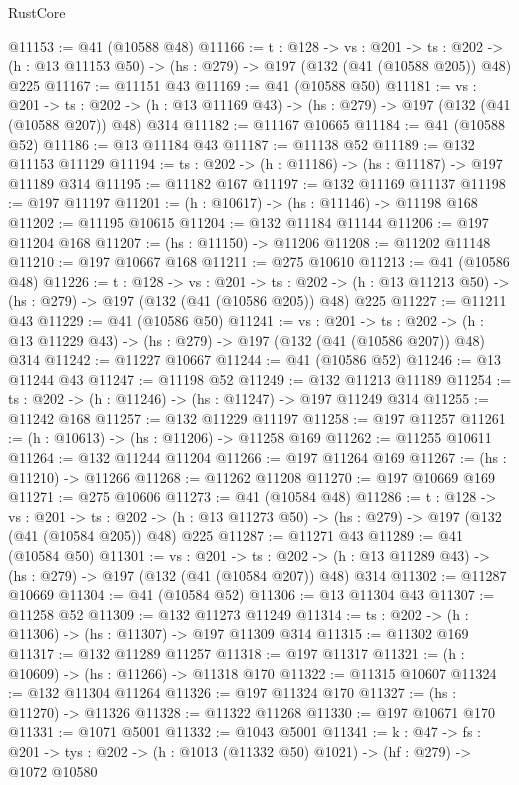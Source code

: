 \begin{lexlean}{RustCore}
\begin{coremodule}
@11153 := @41 (@10588 @48)
@11166 := {t : @128} ->
  {vs : @201} ->
  {ts : @202} -> (h : @13 @11153 @50) -> (hs : @279) -> @197 (@132 (@41 (@10588 @205)) @48) @225
@11167 := @11151 @43
@11169 := @41 (@10588 @50)
@11181 := {vs : @201} ->
  {ts : @202} -> (h : @13 @11169 @43) -> (hs : @279) -> @197 (@132 (@41 (@10588 @207)) @48) @314
@11182 := @11167 @10665
@11184 := @41 (@10588 @52)
@11186 := @13 @11184 @43
@11187 := @11138 @52
@11189 := @132 @11153 @11129
@11194 := {ts : @202} -> (h : @11186) -> (hs : @11187) -> @197 @11189 @314
@11195 := @11182 @167
@11197 := @132 @11169 @11137
@11198 := @197 @11197
@11201 := (h : @10617) -> (hs : @11146) -> @11198 @168
@11202 := @11195 @10615
@11204 := @132 @11184 @11144
@11206 := @197 @11204 @168
@11207 := (hs : @11150) -> @11206
@11208 := @11202 @11148
@11210 := @197 @10667 @168
@11211 := @275 @10610
@11213 := @41 (@10586 @48)
@11226 := {t : @128} ->
  {vs : @201} ->
  {ts : @202} -> (h : @13 @11213 @50) -> (hs : @279) -> @197 (@132 (@41 (@10586 @205)) @48) @225
@11227 := @11211 @43
@11229 := @41 (@10586 @50)
@11241 := {vs : @201} ->
  {ts : @202} -> (h : @13 @11229 @43) -> (hs : @279) -> @197 (@132 (@41 (@10586 @207)) @48) @314
@11242 := @11227 @10667
@11244 := @41 (@10586 @52)
@11246 := @13 @11244 @43
@11247 := @11198 @52
@11249 := @132 @11213 @11189
@11254 := {ts : @202} -> (h : @11246) -> (hs : @11247) -> @197 @11249 @314
@11255 := @11242 @168
@11257 := @132 @11229 @11197
@11258 := @197 @11257
@11261 := (h : @10613) -> (hs : @11206) -> @11258 @169
@11262 := @11255 @10611
@11264 := @132 @11244 @11204
@11266 := @197 @11264 @169
@11267 := (hs : @11210) -> @11266
@11268 := @11262 @11208
@11270 := @197 @10669 @169
@11271 := @275 @10606
@11273 := @41 (@10584 @48)
@11286 := {t : @128} ->
  {vs : @201} ->
  {ts : @202} -> (h : @13 @11273 @50) -> (hs : @279) -> @197 (@132 (@41 (@10584 @205)) @48) @225
@11287 := @11271 @43
@11289 := @41 (@10584 @50)
@11301 := {vs : @201} ->
  {ts : @202} -> (h : @13 @11289 @43) -> (hs : @279) -> @197 (@132 (@41 (@10584 @207)) @48) @314
@11302 := @11287 @10669
@11304 := @41 (@10584 @52)
@11306 := @13 @11304 @43
@11307 := @11258 @52
@11309 := @132 @11273 @11249
@11314 := {ts : @202} -> (h : @11306) -> (hs : @11307) -> @197 @11309 @314
@11315 := @11302 @169
@11317 := @132 @11289 @11257
@11318 := @197 @11317
@11321 := (h : @10609) -> (hs : @11266) -> @11318 @170
@11322 := @11315 @10607
@11324 := @132 @11304 @11264
@11326 := @197 @11324 @170
@11327 := (hs : @11270) -> @11326
@11328 := @11322 @11268
@11330 := @197 @10671 @170
@11331 := @1071 @5001
@11332 := @1043 @5001
@11341 := {k : @47} ->
  {fs : @201} -> {tys : @202} -> (h : @1013 (@11332 @50) @1021) -> (hf : @279) -> @1072 @10580

\end{coremodule}
\end{lexlean}
